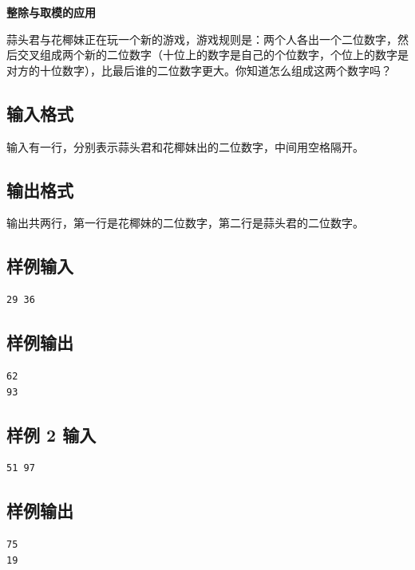 \documentclass{article}
\newcommand{\problemname}[1]{\begin{center}\Large\bfseries #1\end{center}}
\begin{document}
\problemname{整除与取模的应用}

蒜头君与花椰妹正在玩一个新的游戏，游戏规则是：两个人各出一个二位数字，然后交叉组成两个新的二位数字（十位上的数字是自己的个位数字，个位上的数字是对方的十位数字），比最后谁的二位数字更大。你知道怎么组成这两个数字吗？

\subsection*{输入格式}
输入有一行，分别表示蒜头君和花椰妹出的二位数字，中间用空格隔开。

\subsection*{输出格式}
输出共两行，第一行是花椰妹的二位数字，第二行是蒜头君的二位数字。

\subsection*{样例输入}
\begin{verbatim}
29 36
\end{verbatim}

\subsection*{样例输出}
\begin{verbatim}
62
93
\end{verbatim}

\subsection*{样例 2 输入}
\begin{verbatim}
51 97
\end{verbatim}

\subsection*{样例输出}
\begin{verbatim}
75
19
\end{verbatim}
\end{document}

